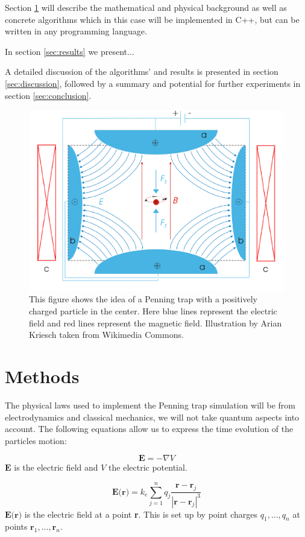 \documentclass[english,notitlepage,reprint,nofootinbib]{revtex4-1}  %
\begin{document}
Section \ref*{sec:methods} will describe the mathematical and physical background as well as concrete algorithms which in this case will be 
implemented in C++, but can be written in any programming language.

In section \ref*{sec:results} we present... 

A detailed discussion of the algorithms' and results is presented in section \ref*{sec:discussion}, 
followed by a summary and potential for further experiments in section \ref*{sec:conclusion}.

\begin{figure}[H]
    \centering
    \includegraphics[width=.5\textwidth]{../figures/Penning_trap.pdf}
    \caption{This figure shows the idea of a Penning trap with a positively charged particle in the center. 
    Here blue lines represent the electric field and red lines represent the magnetic field. 
    Illustration by Arian Kriesch taken from Wikimedia Commons.}
    \label{fig:Penning_trap}
\end{figure}

\section{Methods}\label{sec:methods}
The physical laws used to implement the Penning trap simulation will be from electrodynamics and classical mechanics, we will not take quantum aspects into account. 
The following equations allow us to express the time evolution of the particles motion:

\begin{equation}
    \textbf{E} = - \nabla V
\end{equation}\label{eq:el_field}
$\textbf{E}$ is the electric field and $V$ the electric potential.

\begin{equation}
    \textbf{E(r)} = k_e \sum_{j=1}^{n} q_j \frac{\textbf{r} - \textbf{r}_j}{|\textbf{r} - \textbf{r}_j|^3}
\end{equation}\label{eq:el_at_r}
$\textbf{E(r)}$ is the electric field at a point \textbf{r}. This is set up by point charges ${q_1,...,q_n}$ at points ${\textbf{r}_1,...,\textbf{r}_n}$.
\end{document}

